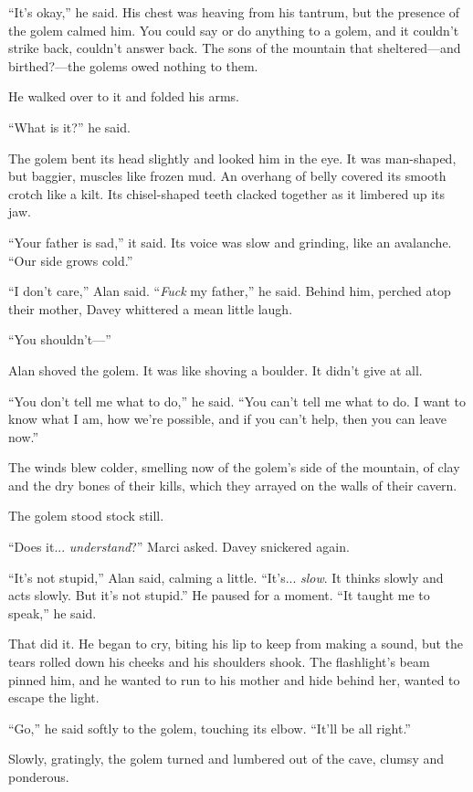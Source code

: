 \documentclass{article}
\begin{document}
``It's okay,'' he said.  His chest was heaving from his tantrum, but
the presence of the golem calmed him.  You could say or do anything to
a golem, and it couldn't strike back, couldn't answer back.  The sons
of the mountain that sheltered---and birthed?---the golems owed
nothing to them.

He walked over to it and folded his arms.

``What is it?'' he said.

The golem bent its head slightly and looked him in the eye.  It was
man-shaped, but baggier, muscles like frozen mud.  An overhang of
belly covered its smooth crotch like a kilt.  Its chisel-shaped teeth
clacked together as it limbered up its jaw.

``Your father is sad,'' it said.  Its voice was slow and grinding,
like an avalanche.  ``Our side grows cold.''

``I don't care,'' Alan said.  ``\textit{Fuck} my father,'' he said. 
Behind him, perched atop their mother, Davey whittered a mean little
laugh.

``You shouldn't---''

Alan shoved the golem.  It was like shoving a boulder.  It didn't give
at all.

``You don't tell me what to do,'' he said.  ``You can't tell me what
to do.  I want to know what I am, how we're possible, and if you can't
help, then you can leave now.''

The winds blew colder, smelling now of the golem's side of the
mountain, of clay and the dry bones of their kills, which they arrayed
on the walls of their cavern.

The golem stood stock still.

``Does it...  \textit{understand}?'' Marci asked.  Davey snickered
again.

``It's not stupid,'' Alan said, calming a little.  ``It's... 
\textit{slow}.  It thinks slowly and acts slowly.  But it's not
stupid.'' He paused for a moment.  ``It taught me to speak,'' he said.

That did it.  He began to cry, biting his lip to keep from making a
sound, but the tears rolled down his cheeks and his shoulders shook. 
The flashlight's beam pinned him, and he wanted to run to his mother
and hide behind her, wanted to escape the light.

``Go,'' he said softly to the golem, touching its elbow.  ``It'll be
all right.''

Slowly, gratingly, the golem turned and lumbered out of the cave,
clumsy and ponderous.
\end{document}
